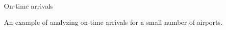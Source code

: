 \documentclass[11pt]{beamer}
\begin{document}
\begin{frame}{
	\begin{minipage}[t]{0.55\textwidth}
		On-time arrivals
	\end{minipage}
	\hfill
	\begin{minipage}[t]{0.35\textwidth}
		\flushright
	\end{minipage}
}{}
An example of analyzing on-time arrivals for a small number of airports.

\begin{center}
\end{center}
\end{frame}
\end{document}
